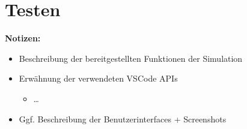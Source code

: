 \section{Testen}\label{section:prototypische-implementierung:testen}

\begin{note}
    \textbf{Notizen:}
    \begin{itemize}
        \item Beschreibung der bereitgestellten Funktionen der Simulation
        \item Erwähnung der verwendeten VSCode APIs
              \begin{itemize}
                  \item \dots
              \end{itemize}
        \item Ggf. Beschreibung der Benutzerinterfaces + Screenshots
    \end{itemize}
\end{note}